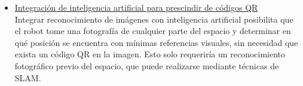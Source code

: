 \begin{itemize}
	\item \underline{Integración de inteligencia artificial para prescindir de códigos QR} \\
	Integrar reconocimiento de imágenes con inteligencia artificial posibilita que el robot tome una fotografía de cualquier parte del espacio y determinar en qué posición se encuentra con mínimas referencias visuales, sin necesidad que exista un código QR en la imagen. Esto solo requeriría un reconocimiento fotográfico previo del espacio, que puede realizarse mediante técnicas de SLAM. \cite{micolini2022hermes} \\
\end{itemize}